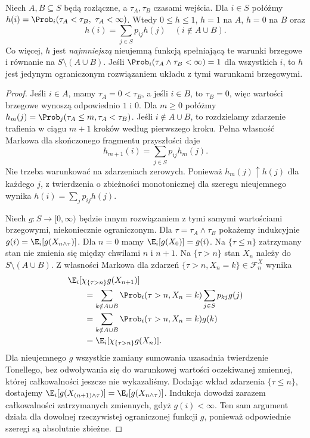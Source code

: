 \begin{twierdzenie}
Niech $A,B\subseteq S$ będą rozłączne, a
$\tau_A,\tau_B$ czasami wejścia.
Dla $i\in S$ połóżmy
$h(i)=\Prob_i(\tau_A<\tau_B,\ \tau_A<\infty)$.
Wtedy $0\leq h\leq1$, $h=1$ na $A$,
$h=0$ na $B$ oraz
\[
h(i)=\sum_{j\in S}p_{ij}h(j)
\quad(i\notin A\cup B).
\]
Co więcej, $h$ jest \emph{najmniejszą}
nieujemną funkcją spełniającą te warunki brzegowe
i równanie na $S\setminus(A\cup B)$.
Jeśli $\Prob_i(\tau_A\wedge\tau_B<\infty)=1$
dla wszystkich $i$, to $h$ jest jedynym
ograniczonym rozwiązaniem układu z tymi
warunkami brzegowymi.
\end{twierdzenie}
\begin{proof}
Jeśli $i\in A$, mamy $\tau_A=0<\tau_B$,
a jeśli $i\in B$, to $\tau_B=0$,
więc wartości brzegowe wynoszą odpowiednio $1$ i $0$.
Dla $m\geq0$ połóżmy
$h_m(j)=\Prob_j(\tau_A\leq m,\tau_A<\tau_B)$.
Jeśli $i\notin A\cup B$, to rozdzielamy zdarzenie
trafienia w ciągu $m+1$ kroków według pierwszego kroku.
Pełna własność Markowa dla skończonego fragmentu
przyszłości daje
\[
h_{m+1}(i)=\sum_{j\in S}p_{ij}h_m(j).
\]
Nie trzeba warunkować na zdarzeniach zerowych.
Ponieważ $h_m(j)\uparrow h(j)$ dla każdego $j$,
z twierdzenia o zbieżności monotonicznej dla
szeregu nieujemnego wynika $h(i)=\sum_j p_{ij}h(j)$.

Niech $g:S\to[0,\infty)$ będzie innym rozwiązaniem
z tymi samymi wartościami brzegowymi, niekoniecznie
ograniczonym. Dla $\tau=\tau_A\wedge\tau_B$
pokażemy indukcyjnie
$g(i)=\E_i[g(X_{n\wedge\tau})]$.
Dla $n=0$ mamy $\E_i[g(X_0)]=g(i)$.
Na $\{\tau\leq n\}$ zatrzymany stan nie zmienia się
między chwilami $n$ i $n+1$. Na $\{\tau>n\}$
stan $X_n$ należy do $S\setminus(A\cup B)$.
Z własności Markowa dla zdarzeń
$\{\tau>n,X_n=k\}\in\mathcal F_n^X$ wynika
\begin{align*}
&\E_i[\chi_{\{\tau>n\}}g(X_{n+1})]\\
&\qquad=\sum_{k\notin A\cup B}\Prob_i(\tau>n,X_n=k)
                         \sum_{j\in S}p_{kj}g(j)\\
&\qquad=\sum_{k\notin A\cup B}\Prob_i(\tau>n,X_n=k)g(k)\\
&\qquad=\E_i[\chi_{\{\tau>n\}}g(X_n)].
\end{align*}
Dla nieujemnego $g$ wszystkie zamiany sumowania
uzasadnia twierdzenie Tonellego, bez odwoływania się
do warunkowej wartości oczekiwanej zmiennej, której
całkowalności jeszcze nie wykazaliśmy. Dodając
wkład zdarzenia $\{\tau\leq n\}$, dostajemy
$\E_i[g(X_{(n+1)\wedge\tau})]=\E_i[g(X_{n\wedge\tau})]$.
Indukcja dowodzi zarazem całkowalności zatrzymanych
zmiennych, gdyż $g(i)<\infty$. Ten sam argument działa
dla dowolnej rzeczywistej ograniczonej funkcji $g$,
ponieważ odpowiednie szeregi są absolutnie zbieżne.


\end{proof}
